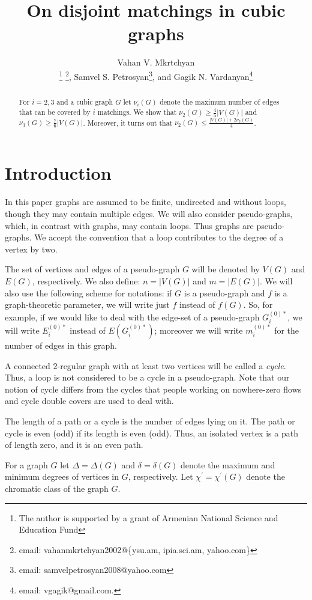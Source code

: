 \documentclass[fleqn,12pt,twoside]{article}
\title{On disjoint matchings in cubic graphs}
\author{Vahan V. Mkrtchyan\address[MCSD]{Department of Informatics and Applied Mathematics,\\
Yerevan State University, Yerevan, 0025, Armenia}\address{Institute for Informatics and Automation Problems,\\
National Academy of Sciences of Republic of Armenia, 0014, Armenia}
\thanks{The author is supported by a grant of Armenian National Science and
Education Fund}
\thanks{email: vahanmkrtchyan2002@\{ysu.am, ipia.sci.am,
yahoo.com\}},
        Samvel S. Petrosyan\addressmark[MCSD]\thanks{email: samvelpetrosyan2008@yahoo.com
},
                and
        Gagik N. Vardanyan\addressmark[MCSD]\thanks{email: vgagik@gmail.com.}}
\begin{document}
\maketitle

\begin{abstract}
For $i=2,3$ and a cubic graph $G$ let $\nu _{i}(G)$ denote the
maximum number of edges that can be covered by $i$ matchings. We
show that $\nu _{2}(G)\geq \frac{4}{5}\left\vert V(G)\right\vert $
and $\nu _{3}(G)\geq \frac{7}{6}\left\vert V(G)\right\vert $.
Moreover, it turns out that $\nu _{2}(G)\leq \frac{|V(G)|+2\nu
_{3}(G)}{4}$.
\end{abstract}



\section{Introduction}

In this paper graphs are assumed to be finite, undirected and without
loops, though they may contain multiple edges. We will also consider
pseudo-graphs, which, in contrast with graphs, may contain loops.
Thus graphs are pseudo-graphs. We accept the convention that a loop
contributes to the degree of a vertex by two.

The set of vertices and edges of a pseudo-graph $G$ will be denoted
by $V(G)$ and $E(G)$, respectively. We also define: $n=|V(G)|$ and
$m=|E(G)|$. We will also use the following scheme for notations:
if $G$ is a pseudo-graph and $f$ is a graph-theoretic
parameter, we will write just $f$ instead of $f(G)$. So, for
example, if we would like to deal with the edge-set of a
pseudo-graph $G^{(0)*}_{i}$, we will write $E^{(0)*}_{i}$ instead of
$E(G^{(0)*}_{i})$; moreover we will write $m^{(0)*}_{i}$ for the
number of edges in this graph.

A connected $2$-regular graph with at least two vertices will be
called a \textit{cycle}. Thus, a loop is not considered to be a
cycle in a pseudo-graph. Note that our notion of cycle differs from
the cycles that people working on nowhere-zero flows and cycle
double covers are used to deal with.

The length of a path or a cycle is the number of edges lying on it.
The path or cycle is even (odd) if its length is even (odd). Thus,
an isolated vertex is a path of length zero, and it is an even path.

For a graph $G$ let $\Delta=\Delta (G)$ and $\delta=\delta (G)$
denote the maximum and minimum degrees of vertices in $G$,
respectively. Let $\chi ^{\prime}=\chi ^{\prime }(G)$ denote the
chromatic class of the graph $G$.
\end{document}

